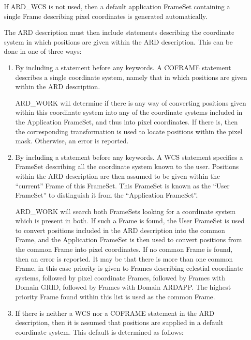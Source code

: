 \documentclass[11pt,nolof]{starlink}
\begin{document}
If ARD\_WCS is not used, then a default application FrameSet containing a
single Frame describing pixel coordinates is generated automatically.

The ARD description must then include statements describing the
coordinate system in which positions are given within the ARD description.
This can be done in one of three ways:

\begin{enumerate}
\item By including a  statement before any
keywords. A COFRAME statement describes a single coordinate system,
namely that in which positions are given within the ARD description.

ARD\_WORK will determine if there is any way of converting positions
given within this coordinate system into any of the coordinate systems
included in the Application FrameSet, and thus into pixel coordinates.
If there is, then the corresponding transformation is used to locate
positions within the pixel mask. Otherwise, an error is reported.

\item By including a  statement before any
keywords. A WCS statement specifies a FrameSet describing all the
coordinate system known to the user. Positions within the ARD description
are then assumed to be given within the ``current'' Frame of this
FrameSet. This FrameSet is known as the ``User FrameSet'' to distinguish
it from the ``Application FrameSet''.

ARD\_WORK will search both FrameSets looking for a coordinate system
which is present in both. If such a Frame is found, the User FrameSet is
used to convert positions included in the ARD description into the common
Frame, and the Application FrameSet is then used to convert positions
from the common Frame into pixel coordinates. If no common Frame is
found, then an error is reported. It may be that there is more than one
common Frame, in this case priority is given to Frames describing
celestial coordinate systems, followed by pixel coordinate Frames,
followed by Frames with Domain GRID, followed by Frames with Domain
ARDAPP. The highest priority Frame found within this list is used as the
common Frame.

\item If there is neither a WCS nor a COFRAME statement in the ARD
description, then it is assumed that positions are supplied in a default
coordinate system. This default is determined as follows:


\end{enumerate}
\end{document}
